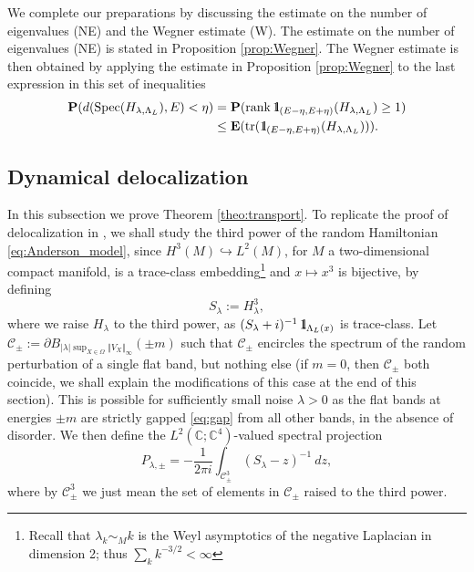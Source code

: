 \documentclass[reqno,12pt,letterpaper]{amsart}
\newcommand{\CC}{{\mathbb C}}
\numberwithin{equation}{section}
\DeclareMathOperator{\Spec}{Spec}
\DeclareMathOperator{\tr}{tr}
\def\indic{\operatorname{1\hskip-2.75pt\relax l}}
\begin{document}
We complete our preparations by discussing the estimate on the number of eigenvalues (NE) and the Wegner estimate (W). The estimate on the number of eigenvalues (NE) is stated in Proposition \ref{prop:Wegner}. 
The Wegner estimate is then obtained by applying the estimate in Proposition \ref{prop:Wegner} to the last expression in this set of inequalities
\begin{equation}
\label{eq:Wegner}
\begin{split} \mathbf P(d(\Spec(H_{\lambda,\Lambda_L}),E)< \eta) &= \mathbf P(\operatorname{rank}\indic_{(E-\eta,E+\eta)}(H_{\lambda,\Lambda_L}) \ge 1)\\
& \le \mathbf E(\tr(\indic_{(E-\eta,E+\eta)}(H_{\lambda,\Lambda_L}) )). \end{split}
\end{equation}
\subsection{Dynamical delocalization}
\label{sec:Dyn_loc}
In this subsection we prove Theorem \ref{theo:transport}.
To replicate the proof of delocalization in \cite{GKS}, we shall study the third power of the random Hamiltonian \eqref{eq:Anderson_model}, since $H^3(M) \hookrightarrow L^2(M)$, for $M$ a two-dimensional compact manifold, is a trace-class embedding\footnote{Recall that $\lambda_k \sim_{M} k$ is the Weyl asymptotics of the negative Laplacian in dimension 2; thus $\sum_k k^{-3/2} <\infty$} and $x \mapsto x^3$ is bijective, by defining
\[ S_{\lambda}:=H_{\lambda}^3,\]
{ where we raise $H_{\lambda}$ to the third power, as $(S_{\lambda}+i)^{-1} \indic_{\Lambda_L(x)}$ is trace-class.}
Let $\mathcal C_{\pm}:=\partial B_{\vert \lambda \vert \sup_{X \in \Omega}  \Vert V_X \Vert_{\infty}}(\pm m)$ such that $\mathcal C_{\pm}$ encircles the spectrum of the random perturbation of a single flat band, but nothing else (if $m=0$, then $\mathcal C_{\pm}$ both coincide, we shall explain the modifications of this case at the end of this section). This is possible for sufficiently small noise $\lambda>0$ as the flat bands at energies $\pm m$ are strictly gapped \eqref{eq:gap} from all other bands, in the absence of disorder.  We then define the $L^2(\CC;\mathbb C^4)$-valued spectral projection
\begin{equation}
\label{eq:spectral_proj}
 P_{\lambda,\pm} = -\frac{1}{2\pi i } \int_{\mathcal C_{\pm}^3} (S_{\lambda}-z)^{-1} \ dz,
 \end{equation}
 where by $\mathcal C_{\pm}^3$ we just mean the set of elements in $\mathcal C_{\pm}$ raised to the third power.
\end{document}
